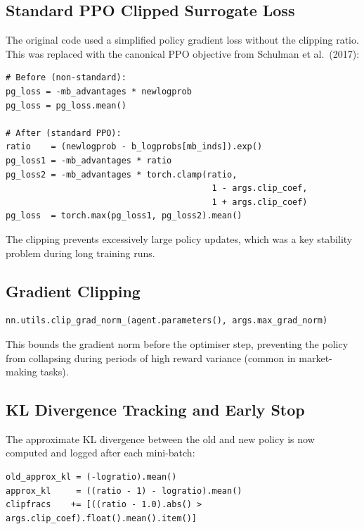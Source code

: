 \documentclass[11pt,a4paper]{article}
\begin{document}
\subsection{Standard PPO Clipped Surrogate Loss}

The original code used a simplified policy gradient loss without the
clipping ratio.  This was replaced with the canonical PPO objective
from Schulman et al.\ (2017):

\begin{lstlisting}
# Before (non-standard):
pg_loss = -mb_advantages * newlogprob
pg_loss = pg_loss.mean()

# After (standard PPO):
ratio    = (newlogprob - b_logprobs[mb_inds]).exp()
pg_loss1 = -mb_advantages * ratio
pg_loss2 = -mb_advantages * torch.clamp(ratio,
                                         1 - args.clip_coef,
                                         1 + args.clip_coef)
pg_loss  = torch.max(pg_loss1, pg_loss2).mean()
\end{lstlisting}

The clipping prevents excessively large policy updates, which was a
key stability problem during long training runs.

\subsection{Gradient Clipping}

\begin{lstlisting}
nn.utils.clip_grad_norm_(agent.parameters(), args.max_grad_norm)
\end{lstlisting}

This bounds the gradient norm before the optimiser step, preventing
the policy from collapsing during periods of high reward variance
(common in market-making tasks).

\subsection{KL Divergence Tracking and Early Stop}

The approximate KL divergence between the old and new policy is now
computed and logged after each mini-batch:

\begin{lstlisting}
old_approx_kl = (-logratio).mean()
approx_kl     = ((ratio - 1) - logratio).mean()
clipfracs    += [((ratio - 1.0).abs() > args.clip_coef).float().mean().item()]
\end{lstlisting}
\end{document}
